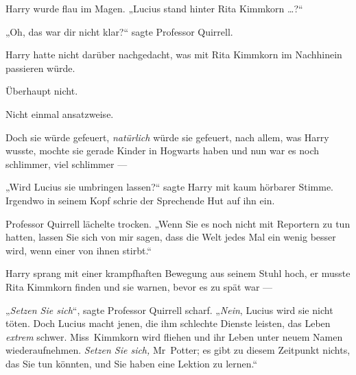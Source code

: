 Harry wurde flau im Magen.
„Lucius stand hinter Rita Kimmkorn …?“

„Oh, das war dir nicht klar?“ sagte Professor Quirrell.

Harry hatte nicht darüber nachgedacht, was mit Rita Kimmkorn im Nachhinein passieren würde.

Überhaupt nicht.

Nicht einmal ansatzweise.

Doch sie würde gefeuert, \emph{natürlich} würde sie gefeuert, nach allem, was Harry wusste, mochte sie gerade Kinder in Hogwarts haben und nun war es noch schlimmer, viel schlimmer —

„Wird Lucius sie umbringen lassen?“ sagte Harry mit kaum hörbarer Stimme. Irgendwo in seinem Kopf schrie der Sprechende Hut auf ihn ein.

Professor Quirrell lächelte trocken.
„Wenn Sie es noch nicht mit Reportern zu tun hatten, lassen Sie sich von mir sagen, dass die Welt jedes Mal ein wenig besser wird, wenn einer von ihnen stirbt.“

Harry sprang mit einer krampfhaften Bewegung aus seinem Stuhl hoch, er musste Rita Kimmkorn finden und sie warnen, bevor es zu spät war —

„\emph{Setzen Sie sich}“, sagte Professor Quirrell scharf.
„\emph{Nein}, Lucius wird sie nicht töten. Doch Lucius macht jenen, die ihm schlechte Dienste leisten, das Leben \emph{extrem} schwer. Miss~Kimmkorn wird fliehen und ihr Leben unter neuem Namen wiederaufnehmen. \emph{Setzen Sie sich,} Mr~Potter; es gibt zu diesem Zeitpunkt nichts, das Sie tun könnten, und Sie haben eine Lektion zu lernen.“

